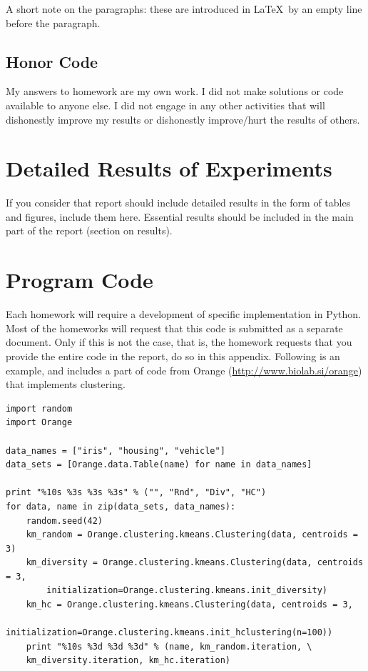 \documentclass[a4paper,11pt]{article}
\begin{document}
A short note on the paragraphs: these are introduced in \LaTeX\ by an empty line before the paragraph.

\subsection*{Honor Code}


My answers to homework are my own work. I did not make solutions or code available to anyone else. I did not engage in any other activities that will dishonestly improve my results or dishonestly improve/hurt the results of others.

\appendix
\appendixpage
\section{\label{app-res}Detailed Results of Experiments}

If you consider that report should include detailed results in the form of tables and figures, include them here. Essential results should be included in the main part of the report (section on results).

\section{\label{app-code}Program Code}

Each homework will require a development of specific implementation in Python. Most of the homeworks will request that this code is submitted as a separate document. Only if this is not the case, that is, the homework requests that you provide the entire code in the report, do so in this appendix. Following is an example, and includes a part of code from Orange (\url{http://www.biolab.si/orange}) that implements 
clustering.

\begin{lstlisting}
import random
import Orange

data_names = ["iris", "housing", "vehicle"]
data_sets = [Orange.data.Table(name) for name in data_names]

print "%10s %3s %3s %3s" % ("", "Rnd", "Div", "HC")
for data, name in zip(data_sets, data_names):
    random.seed(42)
    km_random = Orange.clustering.kmeans.Clustering(data, centroids = 3)
    km_diversity = Orange.clustering.kmeans.Clustering(data, centroids = 3,
        initialization=Orange.clustering.kmeans.init_diversity)
    km_hc = Orange.clustering.kmeans.Clustering(data, centroids = 3,
        initialization=Orange.clustering.kmeans.init_hclustering(n=100))
    print "%10s %3d %3d %3d" % (name, km_random.iteration, \
    km_diversity.iteration, km_hc.iteration)
\end{lstlisting}
\end{document}
